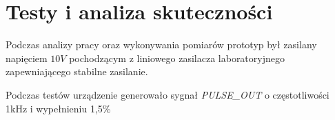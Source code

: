 \chapter{Testy i analiza skuteczności}

Podczas analizy pracy oraz wykonywania pomiarów prototyp był zasilany napięciem $10V$ pochodzącym z liniowego zasilacza laboratoryjnego zapewniającego stabilne zasilanie.

Podczas testów urządzenie generowało sygnał \textit{PULSE\_OUT} o częstotliwości 1kHz i wypełnieniu 1,5\%





